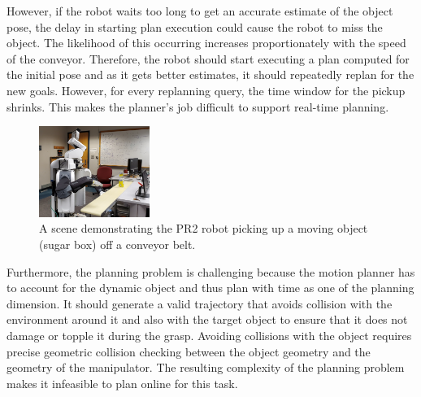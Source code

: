 \documentclass[conference]{IEEEtran}
\begin{document}
However, if the robot waits too long to get an accurate estimate of the object pose, the delay in starting plan execution could cause the robot to miss the object. The likelihood of this occurring increases proportionately with the speed of the conveyor. Therefore, the robot should start executing a plan computed for the initial pose and as it gets better estimates, it should repeatedly replan for the new goals. However, for every replanning query, the time window for the pickup shrinks. This makes the planner's job difficult to support real-time planning.

\begin{figure}[t]
    \centering
    \includegraphics[trim=0 50 0 100, clip, width=0.32\textwidth]{figs/cover_pic.jpg}
    \caption{
    \CaptionTextSize
    A scene demonstrating the PR2 robot picking up a moving object (sugar box) off a conveyor belt.}
    \label{fig:intro_pic}
\end{figure}


Furthermore, the planning problem is challenging because the motion planner has to account for the dynamic object and thus plan with time as one of the planning dimension. It should generate a valid trajectory that avoids collision with the environment around it and also with the target object to ensure that it does not damage or topple it during the grasp. Avoiding collisions with the object requires precise geometric collision checking between the object geometry and the geometry of the manipulator. The resulting complexity of the planning problem makes it infeasible to plan online for this task.
\end{document}
